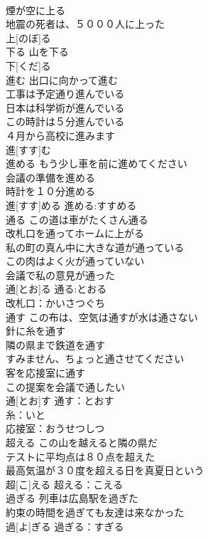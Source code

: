 \documentclass[8pt]{extreport}
\begin{document}
\begin{CJK}{UTF8}{min}
\\	煙が空に上る 
\\	地震の死者は、５０００人に上った 
\\	上[のぼ]る						
\\	下る	山を下る 
\\	下[くだ]る						
\\	進む	出口に向かって進む 
\\	工事は予定通り進んでいる 
\\	日本は科学術が進んでいる 
\\	この時計は５分進んでいる 
\\	４月から高校に進みます 
\\	進[すす]む						
\\	進める	もう少し車を前に進めてください 
\\	会議の準備を進める 
\\	時計を１０分進める 
\\	進[すす]める			進める:すすめる
\\	通る	この道は車がたくさん通る 
\\	改札口を通ってホームに上がる 
\\	私の町の真ん中に大きな道が通っている 
\\	この肉はよく火が通っていない 
\\	会議で私の意見が通った 
\\	通[とお]る			通る:とおる
\\	改札口：かいさつぐち
\\	通す	この布は、空気は通すが水は通さない 
\\	針に糸を通す 
\\	隣の県まで鉄道を通す 
\\	すみません、ちょっと通させてください 
\\	客を応接室に通す 
\\	この提案を会議で通したい 
\\	通[とお]す			通す：とおす
\\	糸：いと
\\	応接室：おうせつしつ
\\	超える	この山を越えると隣の県だ 
\\	テストに平均点は８０点を超えた 
\\	最高気温が３０度を超える日を真夏日という 
\\	超[こ]える			超える：こえる
\\	過ぎる	列車は広島駅を過ぎた 
\\	約束の時間を過ぎても友達は来なかった 
\\	過[よ]ぎる			過ぎる：すぎる

\end{CJK}
\end{document}
